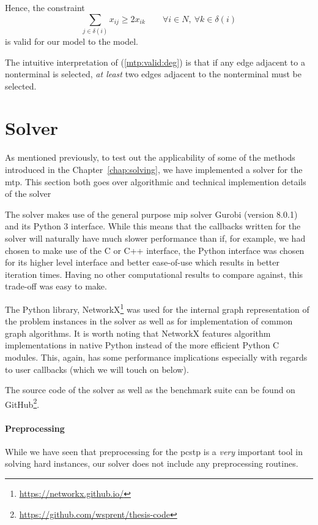  Hence, the constraint
 \begin{equation}\label{mtp:valid:deg}
   \sum_{j \in \delta(i)}x_{ij} \geq 2 x_{ik} \qquad \forall i \in N, \: \forall k \in \delta(i)
 \end{equation}
 is valid for our model to the model.

 The intuitive interpretation of (\ref{mtp:valid:deg}) is that if any edge adjacent to
 a nonterminal is selected, \textit{at least} two edges adjacent to the nonterminal must be selected.
\section{Solver}\label{sec:mtp:solver}
As mentioned previously, to test out the applicability of some of the methods introduced in
the Chapter~\ref{chap:solving}, we have implemented a solver for the \gls{mtp}.
This section both goes over algorithmic and technical implemention details of the solver

The solver makes use of the general purpose \gls{mip} solver
Gurobi \citep{gurobi} (version 8.0.1)
and its Python 3 interface. While this means that the callbacks written for the solver
will naturally have much slower performance than if, for example, we had chosen to make
use of the C or C++ interface, the Python interface was chosen for its higher level interface
and better ease-of-use which results in better iteration times. Having no other computational results
to compare against, this trade-off was easy to make.

The Python library,
NetworkX\footnote{\url{https://networkx.github.io/}} \citep{hagberg2008exploring}
was used for the internal graph representation of the
problem instances in the solver as well as for implementation of common
graph algorithms. It is worth noting that NetworkX features algorithm implementations
in native Python instead of the more efficient Python C modules. This, again, has some
performance implications especially with regards to user callbacks (which we will
 touch on below).

The source code of the solver as well as the benchmark suite
can be found on GitHub\footnote{\url{https://github.com/wsprent/thesis-code}}.

\paragraph{Preprocessing}

While we have seen that preprocessing for the \gls{pcstp} is a \textit{very} important
tool in solving hard instances, our solver does not include any preprocessing routines.

